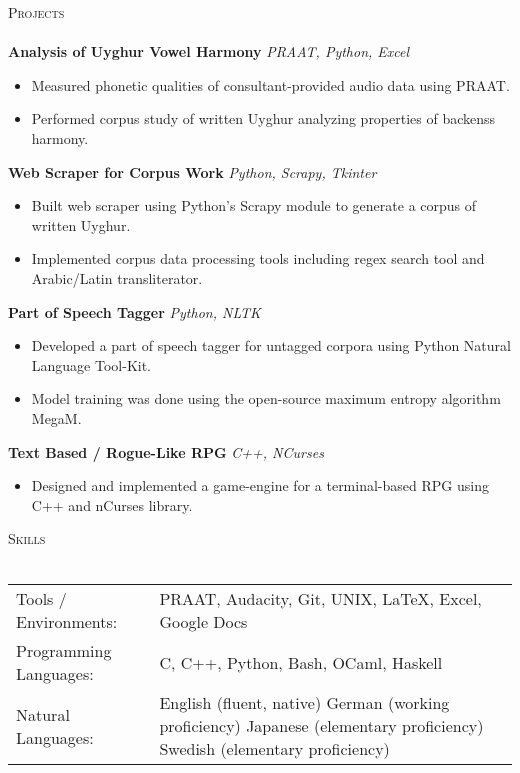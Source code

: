 \documentclass[]{article}
\newcommand{\lineunder} {
    \vspace*{-8pt} \\
    \hspace*{-18pt} \hrulefill \\
}
\newcommand{\header} [1] {
    {\hspace*{-18pt}\vspace*{6pt} \textsc{#1}}
    \vspace*{-6pt} \lineunder
}
\begin{document}
\header{Projects}
{\textbf{Analysis of Uyghur Vowel Harmony}} \hspace*{5mm} {\sl PRAAT, Python, Excel}
\vspace*{-5pt}\begin{itemize}	\itemsep 0pt 
	\item Measured phonetic qualities of consultant-provided audio data using PRAAT.
	\item Performed corpus study of written Uyghur analyzing properties of backenss harmony.
\end{itemize}
\vspace*{0mm}

{\textbf{Web Scraper for Corpus Work}} \hspace*{5mm} {\sl Python, Scrapy, Tkinter}
\vspace*{-5pt}\begin{itemize}	\itemsep 0pt 
	\item Built web scraper using Python's Scrapy module to generate a corpus of written Uyghur.
	\item Implemented corpus data processing tools including regex search tool and Arabic/Latin transliterator.
\end{itemize}
\vspace*{0mm}


{\textbf{Part of Speech Tagger}} \hspace*{5mm} {\sl Python, NLTK} \\
\vspace*{-5pt}\begin{itemize}	\itemsep 0pt
	\item Developed a part of speech tagger for untagged corpora using Python Natural Language Tool-Kit.
	\item Model training was done using the open-source maximum entropy algorithm MegaM.
\end{itemize}
\vspace*{0mm}
{\textbf{Text Based / Rogue-Like RPG}} \hspace*{5mm} {\sl C++, NCurses} \\
\vspace*{-5pt}\begin{itemize}	\itemsep 0pt
	\item Designed and implemented a game-engine for a terminal-based RPG using C++ and nCurses library.
\end{itemize}
\vspace*{0mm}

\header{Skills}
\begin{tabular}{ l p{11.2cm} }
	Tools / Environments:  & PRAAT, Audacity, Git, UNIX, \LaTeX, Excel, Google Docs
	\\
	Programming Languages: & C, C++, Python, Bash, OCaml, Haskell
	\\
	Natural Languages:     & English \hfill (fluent, native) \newline German \hfill (working proficiency) \newline Japanese \hfill (elementary proficiency) \newline Swedish \hfill (elementary proficiency)
	\\
\end{tabular}
\vspace{2mm}
\end{document}
